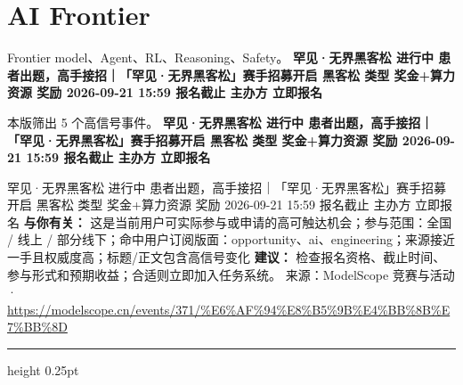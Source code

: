 \documentclass[10.5pt]{ctexart}
\begin{document}
\section*{AI Frontier}
{\color{ormuted} Frontier model、Agent、RL、Reasoning、Safety。}
\vspace{2mm}
{\LARGE\bfseries 罕见·无界黑客松 进行中 患者出题，高手接招｜「罕见·无界黑客松」赛手招募开启 黑客松 类型 奖金+算力资源 奖励 2026-09-21 15:59 报名截止 主办方 立即报名}\par
\vspace{1mm}
{\color{ormuted} 本版筛出 5 个高信号事件。}
\vspace{3mm}
{\Large\bfseries 罕见·无界黑客松 进行中 患者出题，高手接招｜「罕见·无界黑客松」赛手招募开启 黑客松 类型 奖金+算力资源 奖励 2026-09-21 15:59 报名截止 主办方 立即报名}\par
罕见·无界黑客松 进行中 患者出题，高手接招｜「罕见·无界黑客松」赛手招募开启 黑客松 类型 奖金+算力资源 奖励 2026-09-21 15:59 报名截止 主办方 立即报名
\textbf{与你有关：} 这是当前用户可实际参与或申请的高可触达机会；参与范围：全国 / 线上 / 部分线下；命中用户订阅版面：opportunity、ai、engineering；来源接近一手且权威度高；标题/正文包含高信号变化
\textbf{建议：} 检查报名资格、截止时间、参与形式和预期收益；合适则立即加入任务系统。
{\footnotesize\color{ormuted} 来源：ModelScope 竞赛与活动 · \url{https://modelscope.cn/events/371/%E6%AF%94%E8%B5%9B%E4%BB%8B%E7%BB%8D}}
\vspace{4mm}
\hrule height 0.25pt
\vspace{3mm}
\end{document}
